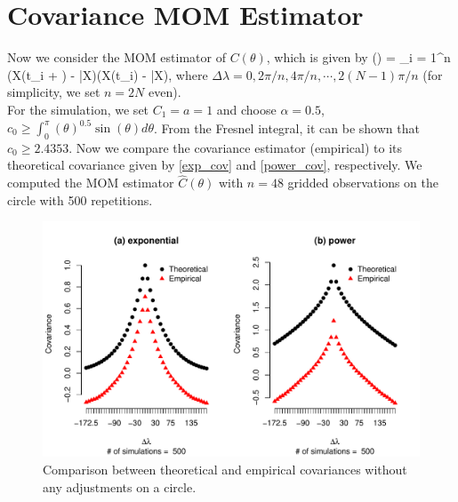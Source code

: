 \vskip 16pt

\section{Covariance MOM Estimator}

Now we consider the MOM estimator of $C(\theta)$, which is given by
\beq \label{covarince_estimator}
(\Delta \lambda) = \sum_{i = 1}^n (X(t_i + \Delta \lambda) - \bar{X})(X(t_i) - \bar{X}),
\eeq
where $\Delta \lambda = 0, 2\pi/n, 4\pi/n, \cdots, 2(N-1)\pi/n$ (for simplicity, we set $n=2N$ even). \\

For the simulation, we set $C_1 = a = 1$ and choose $\alpha = 0.5$, $c_0 \ge \int_0^\pi(\theta)^{0.5} \sin(\theta) d\theta$. From the Fresnel integral, it can be shown that $c_0 \ge 2.4353$. Now we compare the covariance estimator (empirical) to its theoretical covariance given by \eqref{exp_cov} and \eqref{power_cov}, respectively. We computed the MOM estimator $\hat{C}(\theta)$ with $n = 48$ gridded observations on the circle with 500 repetitions.

      \begin{figure}
      	\centering
       	\includegraphics[keepaspectratio, scale = .8]{graphs/covariance_circle.pdf}
      	\caption[Comparison Between Theoretical and Empirical Covariances Without] {Comparison between theoretical and empirical covariances without any adjustments on a circle. }
      	\label{covariance_circle}
      \end{figure}
      
